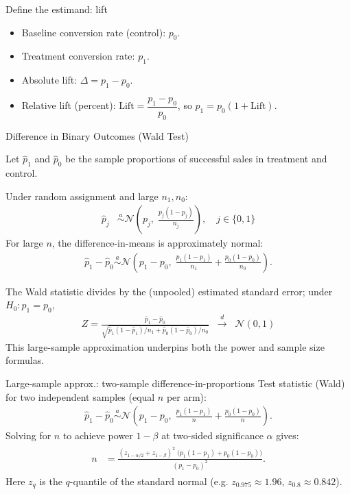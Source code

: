 \documentclass[aspectratio=169,11pt]{beamer}
\begin{document}
\begin{frame}{Define the estimand: lift}
  \begin{itemize}
    \item Baseline conversion rate (control): $p_0$.
    \item Treatment conversion rate: $p_1$.
    \item Absolute lift: $\Delta = p_1 - p_0$.
    \item Relative lift (percent): $\text{Lift} = \dfrac{p_1 - p_0}{p_0}$, so $p_1 = p_0(1+\text{Lift})$.
  \end{itemize}
\end{frame}

\begin{frame}{Difference in Binary Outcomes (Wald Test)}

Let $\hat{p}_1$ and $\hat{p}_0$ be the sample proportions of successful sales in treatment and control.

Under random assignment and large $n_1, n_0$:
\begin{align*}
\hat{p}_j &\overset{a}{\sim} \mathcal{N}\!\left(p_j,\; \frac{p_j(1-p_j)}{n_j}\right), \quad j\in\{0,1\}
\end{align*}
For large $n$, the difference-in-means is approximately normal:
\begin{align*}
\hat{p}_1 - \hat{p}_0 
\overset{a}{\sim} \mathcal{N}\!\left(p_1 - p_0,\;
\frac{p_1(1-p_1)}{n_1} + \frac{p_0(1-p_0)}{n_0}\right).
\end{align*}

The Wald statistic divides by the (unpooled) estimated standard error; under $H_0: p_1 = p_0$,
\begin{align*}
Z = \frac{\hat{p}_1 - \hat{p}_0}
         {\sqrt{\hat{p}_1(1-\hat{p}_1)/n_1 + \hat{p}_0(1-\hat{p}_0)/n_0}}
\;\;\xrightarrow[]{d}\;\; \mathcal{N}(0,1)
\end{align*}
This large-sample approximation underpins both the \alert{power} and \alert{sample size} formulas.
\end{frame}


\begin{frame}{Large-sample approx.: two-sample difference-in-proportions}
  Test statistic (Wald) for two independent samples (equal $n$ per arm):
  \begin{align*}
    \hat{p}_1 - \hat{p}_0 \overset{a}{\sim} \mathcal{N}\!\left(p_1-p_0,\; \frac{p_1(1-p_1)}{n} + \frac{p_0(1-p_0)}{n}\right).
  \end{align*}
  Solving for $n$ to achieve power $1-\beta$ at two-sided significance $\alpha$ gives:
  \begin{align*}
  \begin{aligned}
    n &= \frac{(z_{1-\alpha/2} + z_{1-\beta})^2\;\big(p_1(1-p_1)+p_0(1-p_0)\big)}
               {(p_1-p_0)^2}.
  \end{aligned}
  \end{align*}
  Here $z_{q}$ is the $q$-quantile of the standard normal (e.g. $z_{0.975}\approx 1.96$, $z_{0.8}\approx 0.842$).
\end{frame}
\end{document}
